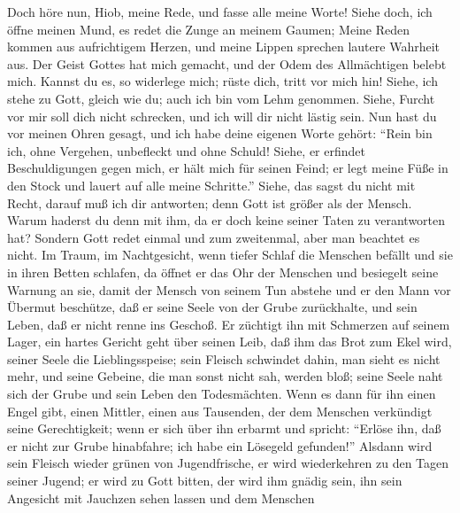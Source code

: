  Doch höre nun, Hiob, meine Rede, und fasse alle meine
Worte!  Siehe doch, ich öffne meinen Mund, es redet die
Zunge an meinem Gaumen;  Meine Reden kommen aus
aufrichtigem Herzen, und meine Lippen sprechen lautere Wahrheit aus.
 Der Geist Gottes hat mich gemacht, und der Odem des
Allmächtigen belebt mich.  Kannst du es, so widerlege
mich; rüste dich, tritt vor mich hin!  Siehe, ich stehe zu
Gott, gleich wie du; auch ich bin vom Lehm genommen. 
Siehe, Furcht vor mir soll dich nicht schrecken, und ich will dir nicht
lästig sein.  Nun hast du vor meinen Ohren gesagt, und ich
habe deine eigenen Worte gehört:  ``Rein bin ich, ohne
Vergehen, unbefleckt und ohne Schuld!  Siehe, er erfindet
Beschuldigungen gegen mich, er hält mich für seinen Feind;
 er legt meine Füße in den Stock und lauert auf alle
meine Schritte.''  Siehe, das sagst du nicht mit Recht,
darauf muß ich dir antworten; denn Gott ist größer als der Mensch.
 Warum haderst du denn mit ihm, da er doch keine seiner
Taten zu verantworten hat?  Sondern Gott redet einmal und
zum zweitenmal, aber man beachtet es nicht.  Im Traum, im
Nachtgesicht, wenn tiefer Schlaf die Menschen befällt und sie in ihren
Betten schlafen,  da öffnet er das Ohr der Menschen und
besiegelt seine Warnung an sie,  damit der Mensch von
seinem Tun abstehe und er den Mann vor Übermut beschütze,
 daß er seine Seele von der Grube zurückhalte, und sein
Leben, daß er nicht renne ins Geschoß.  Er züchtigt ihn
mit Schmerzen auf seinem Lager, ein hartes Gericht geht über seinen
Leib,  daß ihm das Brot zum Ekel wird, seiner Seele die
Lieblingsspeise;  sein Fleisch schwindet dahin, man sieht
es nicht mehr, und seine Gebeine, die man sonst nicht sah, werden bloß;
 seine Seele naht sich der Grube und sein Leben den
Todesmächten.  Wenn es dann für ihn einen Engel gibt,
einen Mittler, einen aus Tausenden, der dem Menschen verkündigt seine
Gerechtigkeit;  wenn er sich über ihn erbarmt und
spricht: ``Erlöse ihn, daß er nicht zur Grube hinabfahre; ich habe ein
Lösegeld gefunden!''  Alsdann wird sein Fleisch wieder
grünen von Jugendfrische, er wird wiederkehren zu den Tagen seiner
Jugend;  er wird zu Gott bitten, der wird ihm gnädig
sein, ihn sein Angesicht mit Jauchzen sehen lassen und dem Menschen
